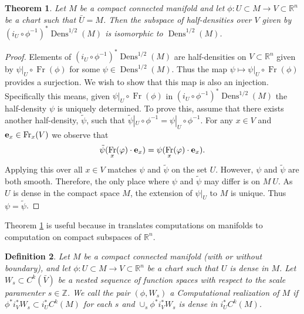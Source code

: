 \documentclass[12pt]{amsart}
\newtheorem{thm}{Theorem}[section]
\newtheorem{defn}[thm]{Definition}
\DeclareMathOperator{\Dens}{Dens}
\DeclareMathOperator{\Fr}{Fr}
\begin{document}
\begin{thm} \label{thm:global_chart}
  Let $M$ be a compact connected manifold and let
  $\phi:U \subset M \to V \subset \mathbb{R}^n$
  be a chart such that $\bar{U} = M$.
  Then the subspace of half-densities over $V$ given by
  $(i_U \circ \phi^{-1})^* \Dens^{1/2}(M)$ is isomorphic
  to $\Dens^{1/2}(M)$.
\end{thm}
\begin{proof}
  Elements of $(i_U \circ \phi^{-1})^* \Dens^{1/2}(M)$
  are half-densities on $V \subset \mathbb{R}^n$ given by $ \left. \psi \right|_{U} \circ \Fr(\phi)$ for some $\psi \in \Dens^{1/2}(M)$.
  Thus the map $\psi \mapsto \psi|_U \circ \Fr(\phi)$ provides a surjection.
  We wish to show that this map is also an injection.
  Specifically this means, given $\left. \psi \right|_{U} \circ \Fr(\phi)$ in $(i_U \circ \phi^{-1})^*\Dens^{1/2}(M)$ the half-density $\psi$ is uniquely determined.
  To prove this, assume that there exists another half-density,
  $\tilde{\psi}$, such that $\tilde{\psi}|_U \circ \phi^{-1} = \psi|_U \circ \phi^{-1}$.
  For any $x \in V$ and ${\bf e}_x \in \Fr_x(V)$ we observe that
  \begin{align*}
    \tilde{\psi}( \Fr_x(\varphi) \cdot {\bf e}_x) = \psi( \Fr_x( \varphi) \cdot {\bf e}_x).
  \end{align*}
  Applying this over all $x \in V$ matches $\psi$ and $\tilde{\psi}$ on the set $U$.
  However, $\psi$ and $\tilde{\psi}$ are both smooth.
  Therefore, the only place where $\psi$ and $\tilde{\psi}$ may differ is on $M \ U$.
  As $U$ is dense in the compact space $M$,
  the extension of $\psi|_U$ to $M$ is unique.
  Thus $\psi = \tilde{\psi}$.
\end{proof}

  Theorem \ref{thm:global_chart} is useful because in translates computations on manifolds to computation on compact subspaces of $\mathbb{R}^n$.

\begin{defn}
  Let $M$ be a compact connected manifold (with or without boundary), and let $\phi:U \subset M \to V \subset \mathbb{R}^n$ be a chart such that $U$ is dense in $M$.
  Let $W_s \subset C^k(\bar{V})$ be a nested sequence of function spaces
  with respect to the scale paramenter $s \in \mathbb{Z}$.
  We call the pair $(\phi, W_s)$ a \emph{Computational realization of $M$}
  if $\phi^* i_V^*W_s \subset i_{U}^* C^k(M)$ for each $s$ and $\cup_s \phi^*i_V^*W_s$ is dense in $i_{U}^*C^k(M)$.
\end{defn}
\end{document}
